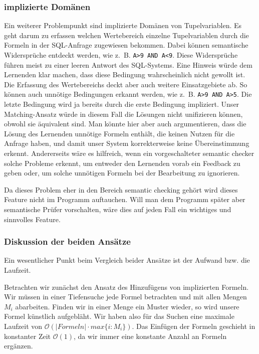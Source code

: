 \subsubsection{implizierte Domänen}

Ein weiterer Problempunkt sind implizierte Domänen von Tupelvariablen. Es geht darum zu erfassen welchen Wertebereich einzelne Tupelvariablen durch die Formeln in der SQL-Anfrage zugewiesen bekommen. Dabei können semantische Widersprüche entdeckt werden, wie \mbox{z. B.} \verb|A>9 AND A<9|. Diese Widersprüche führen meist zu einer leeren Antwort des SQL-Systems. Eine Hinweis würde dem Lernenden klar machen, dass diese Bedingung wahrscheinlich nicht gewollt ist. Die Erfassung des Wertebereichs deckt aber auch weitere Einsatzgebiete ab. So können auch unnötige Bedingungen erkannt werden, wie \mbox{z. B.} \verb|A>9 AND A>5|. Die letzte Bedingung wird ja bereits durch die erste Bedingung impliziert. Unser Matching-Ansatz würde in diesem Fall die Lösungen nicht unifizieren können, obwohl sie äquivalent sind. Man könnte hier aber auch argumentieren, dass die Lösung des Lernenden unnötige Formeln enthält, die keinen Nutzen für die Anfrage haben, und damit unser System korrekterweise keine Übereinstimmung erkennt. Andererseits wäre es hilfreich, wenn ein vorgeschalteter semantic checker solche Probleme erkennt, um entweder den Lernenden vorab ein Feedback zu geben oder, um solche unnötigen Formeln bei der Bearbeitung zu ignorieren. 

Da dieses Problem eher in den Bereich semantic checking gehört wird dieses Feature nicht im Programm auftauchen. Will man dem Programm später aber semantische Prüfer vorschalten, wäre dies auf jeden Fall ein wichtiges und sinnvolles Feature.

\subsubsection{Diskussion der beiden Ansätze}

Ein wesentlicher Punkt beim Vergleich beider Ansätze ist der Aufwand bzw. die Laufzeit. 

Betrachten wir zunächst den Ansatz des Hinzufügens von implizierten Formeln. Wir müssen in einer Tiefensuche jede Formel betrachten und mit allen Mengen $M_i$ abarbeiten. Finden wir in einer Menge ein Muster wieder, so wird unsere Formel künstlich aufgebläht. Wir haben also für das Suchen eine maximale Laufzeit von $\mathcal{O}(\mathit{\vert Formeln\vert \cdot max\{i : M_i\}})$. Das Einfügen der Formeln geschieht in konstanter Zeit $\mathcal{O}(1)$, da wir immer eine konstante Anzahl an Formeln ergänzen.

